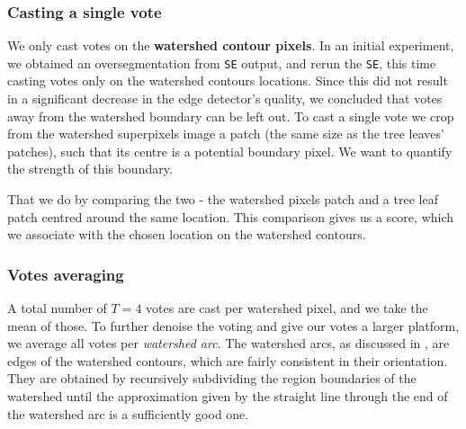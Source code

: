 \subsubsection{Casting a single vote}
We only cast votes on the {\bf watershed contour pixels}. In an initial experiment, we obtained an oversegmentation from {\tt SE} output, and rerun the {\tt SE}, this time casting votes only on the watershed contours locations. Since this did not result in a significant decrease in the edge detector's quality, we concluded that votes away from the watershed boundary can be left out. 
To cast a single vote %
we crop from the watershed superpixels image a patch (the same size as the tree leaves' patches), such that its centre is a potential boundary pixel. We want to quantify the strength of this boundary. 

That we do by comparing the two - the watershed pixels patch and a tree leaf patch centred around the same location. This comparison gives us a score, which we associate with the chosen location on the watershed contours.

\subsubsection{Votes averaging}
A total number of $T=4$ votes are cast per watershed pixel, and we take the mean of those. To further denoise the voting and give our votes a larger platform, %
we average all votes per \textit{watershed arc}. The watershed arcs, as discussed in , are edges of the watershed contours, which are fairly consistent in their orientation. They are obtained by recursively subdividing the region boundaries of the watershed until the approximation given by the straight line through the end of the watershed arc is a sufficiently good one. %

